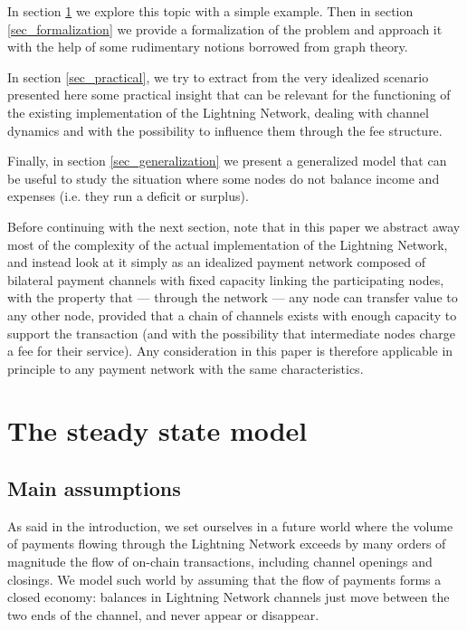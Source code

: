 \documentclass[a4paper]{article}
\begin{document}
In section \ref{sec_steadystate} we explore this topic with a simple example. Then in section \ref{sec_formalization} we provide a formalization of the problem and approach it with the help of some rudimentary notions borrowed from graph theory.

In section \ref{sec_practical}, we try to extract from the very idealized scenario presented here some practical insight that can be relevant for the functioning of the existing implementation of the Lightning Network, dealing with channel dynamics and with the possibility to influence them through the fee structure.

Finally, in section \ref{sec_generalization} we present a generalized model that can be useful to study the situation where some nodes do not balance income and expenses (i.e. they run a deficit or surplus).

Before continuing with the next section, note that in this paper we abstract away most of the complexity of the actual implementation of the Lightning Network, and instead look at it simply as an idealized payment network composed of bilateral payment channels with fixed capacity linking the participating nodes, with the property that --- through the network --- any node can transfer value to any other node, provided that a chain of channels exists with enough capacity to support the transaction (and with the possibility that intermediate nodes charge a fee for their service). Any consideration in this paper is therefore applicable in principle to any payment network with the same characteristics.

\section{The steady state model}\label{sec_steadystate}

\subsection{Main assumptions}

As said in the introduction, we set ourselves in a future world where the volume of payments flowing through the Lightning Network exceeds by many orders of magnitude the flow of on-chain transactions, including channel openings and closings. We model such world by assuming that the flow of payments forms a closed economy: balances in Lightning Network channels just move between the two ends of the channel, and never appear or disappear.
\end{document}
